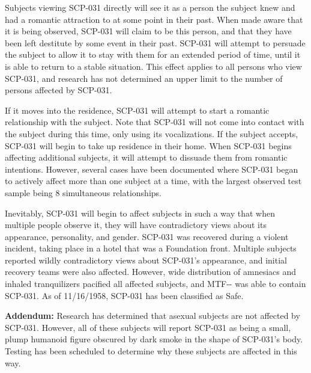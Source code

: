 Subjects viewing SCP-031 directly will see it as a person the subject knew and had a romantic attraction to at some point in their past. When made aware that it is being observed, SCP-031 will claim to be this person, and that they have been left destitute by some event in their past. SCP-031 will attempt to persuade the subject to allow it to stay with them for an extended period of time, until it is able to return to a stable situation. This effect applies to all persons who view SCP-031, and research has not determined an upper limit to the number of persons affected by SCP-031.

If it moves into the residence, SCP-031 will attempt to start a romantic relationship with the subject. Note that SCP-031 will not come into contact with the subject during this time, only using its vocalizations. If the subject accepts, SCP-031 will begin to take up residence in their home. When SCP-031 begins affecting additional subjects, it will attempt to dissuade them from romantic intentions. However, several cases have been documented where SCP-031 began to actively affect more than one subject at a time, with the largest observed test sample being 8 simultaneous relationships.

Inevitably, SCP-031 will begin to affect subjects in such a way that when multiple people observe it, they will have contradictory views about its appearance, personality, and gender. SCP-031 was recovered during a violent incident, taking place in a hotel that was a Foundation front. Multiple subjects reported wildly contradictory views about SCP-031's appearance, and initial recovery teams were also affected. However, wide distribution of amnesiacs and inhaled tranquilizers pacified all affected subjects, and MTF-- was able to contain SCP-031. As of 11/16/1958, SCP-031 has been classified as Safe.

\textbf{Addendum:} Research has determined that asexual subjects are not affected by SCP-031. However, all of these subjects will report SCP-031 as being a small, plump humanoid figure obscured by dark smoke in the shape of SCP-031's body. Testing has been scheduled to determine why these subjects are affected in this way.